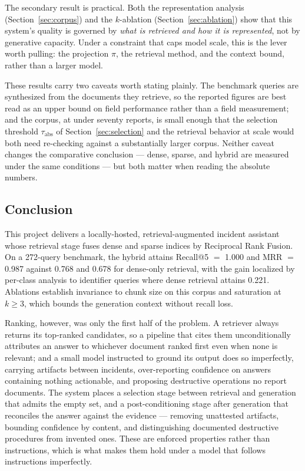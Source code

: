 \documentclass[12pt, a4paper]{article}
\begin{document}
The secondary result is practical. Both the representation analysis (Section~\ref{sec:corpus}) and the $k$-ablation (Section~\ref{sec:ablation}) show that this system's quality is governed by \emph{what is retrieved and how it is represented}, not by generative capacity. Under a constraint that caps model scale, this is the lever worth pulling: the projection $\pi$, the retrieval method, and the context bound, rather than a larger model.

These results carry two caveats worth stating plainly. The benchmark queries are synthesized from the documents they retrieve, so the reported figures are best read as an upper bound on field performance rather than a field measurement; and the corpus, at under seventy reports, is small enough that the selection threshold $\tau_{\text{abs}}$ of Section~\ref{sec:selection} and the retrieval behavior at scale would both need re-checking against a substantially larger corpus. Neither caveat changes the comparative conclusion — dense, sparse, and hybrid are measured under the same conditions — but both matter when reading the absolute numbers.

\subsection{Conclusion}

This project delivers a locally-hosted, retrieval-augmented incident assistant whose retrieval stage fuses dense and sparse indices by Reciprocal Rank Fusion. On a 272-query benchmark, the hybrid attains Recall@5 $=$ 1.000 and MRR $=$ 0.987 against 0.768 and 0.678 for dense-only retrieval, with the gain localized by per-class analysis to identifier queries where dense retrieval attains 0.221. Ablations establish invariance to chunk size on this corpus and saturation at $k \geq 3$, which bounds the generation context without recall loss.

Ranking, however, was only the first half of the problem. A retriever always returns its top-ranked candidates, so a pipeline that cites them unconditionally attributes an answer to whichever document ranked first even when none is relevant; and a small model instructed to ground its output does so imperfectly, carrying artifacts between incidents, over-reporting confidence on answers containing nothing actionable, and proposing destructive operations no report documents. The system places a selection stage between retrieval and generation that admits the empty set, and a post-conditioning stage after generation that reconciles the answer against the evidence --- removing unattested artifacts, bounding confidence by content, and distinguishing documented destructive procedures from invented ones. These are enforced properties rather than instructions, which is what makes them hold under a model that follows instructions imperfectly.
\end{document}
